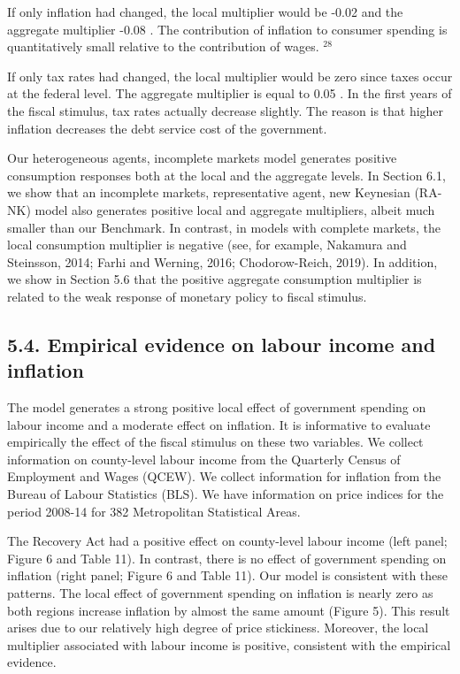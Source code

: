 \documentclass[10pt]{article}
\begin{document}
If only inflation had changed, the local multiplier would be -0.02 and the aggregate multiplier -0.08 . The contribution of inflation to consumer spending is quantitatively small relative to the contribution of wages. ${ }^{28}$

If only tax rates had changed, the local multiplier would be zero since taxes occur at the federal level. The aggregate multiplier is equal to 0.05 . In the first years of the fiscal stimulus, tax rates actually decrease slightly. The reason is that higher inflation decreases the debt service cost of the government.

Our heterogeneous agents, incomplete markets model generates positive consumption responses both at the local and the aggregate levels. In Section 6.1, we show that an incomplete markets, representative agent, new Keynesian (RA-NK) model also generates positive local and aggregate multipliers, albeit much smaller than our Benchmark. In contrast, in models with complete markets, the local consumption multiplier is negative (see, for example, Nakamura and Steinsson, 2014; Farhi and Werning, 2016; Chodorow-Reich, 2019). In addition, we show in Section 5.6 that the positive aggregate consumption multiplier is related to the weak response of monetary policy to fiscal stimulus.

\subsection*{5.4. Empirical evidence on labour income and inflation}
The model generates a strong positive local effect of government spending on labour income and a moderate effect on inflation. It is informative to evaluate empirically the effect of the fiscal stimulus on these two variables. We collect information on county-level labour income from the Quarterly Census of Employment and Wages (QCEW). We collect information for inflation from the Bureau of Labour Statistics (BLS). We have information on price indices for the period 2008-14 for 382 Metropolitan Statistical Areas.

The Recovery Act had a positive effect on county-level labour income (left panel; Figure 6 and Table 11). In contrast, there is no effect of government spending on inflation (right panel; Figure 6 and Table 11). Our model is consistent with these patterns. The local effect of government spending on inflation is nearly zero as both regions increase inflation by almost the same amount (Figure 5). This result arises due to our relatively high degree of price stickiness. Moreover, the local multiplier associated with labour income is positive, consistent with the empirical evidence.
\end{document}
